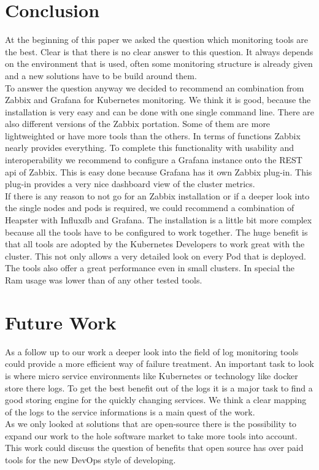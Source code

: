 \section{Conclusion}
At the beginning of this paper we asked the question which monitoring tools are the best. Clear is that there is no clear answer to this question. It always depends on the environment that is used, often some monitoring structure is already given and a new solutions have to be build around them.\\
To answer the question anyway we decided to recommend an combination from Zabbix and Grafana for Kubernetes monitoring. We think it is good, because the installation is very easy and can be done with one single command line. There are also different versions of the Zabbix portation. Some of them are more lightweighted or have more tools than the others. In terms of functions Zabbix nearly provides everything. To complete this functionality with usability and interoperability we recommend to configure a Grafana instance onto the REST api of Zabbix. This is easy done because Grafana has it own Zabbix plug-in. This plug-in provides a very nice dashboard view of the cluster metrics.
\\
If there is any reason to not go for an Zabbix installation or if a deeper look into the single nodes and pods is required, we could recommend a combination of Heapster with Influxdb and Grafana. The installation is a little bit more complex because all the tools have to be configured to work together. The huge benefit is that all tools are adopted by the Kubernetes Developers to work great with the cluster. This not only allows a very detailed look on every Pod that is deployed. The tools also offer a great performance even in small clusters. In special the Ram usage was lower than of any other tested tools.

\section{Future Work}
As a follow up to our work a deeper look into the field of log monitoring tools could provide a more efficient way of failure treatment. An important task to look is where micro service environments like Kubernetes or technology like docker store there logs. To get the best benefit out of the logs it is a major task to find a good storing engine for the quickly changing services. We think a clear mapping of the logs to the service informations is a main quest of the work.\\
As we only looked at solutions that are open-source there is the possibility to expand our work to the hole software market to take more tools into account. This work could discuss the question of benefits that open source has over paid tools for the new DevOps style of developing.


